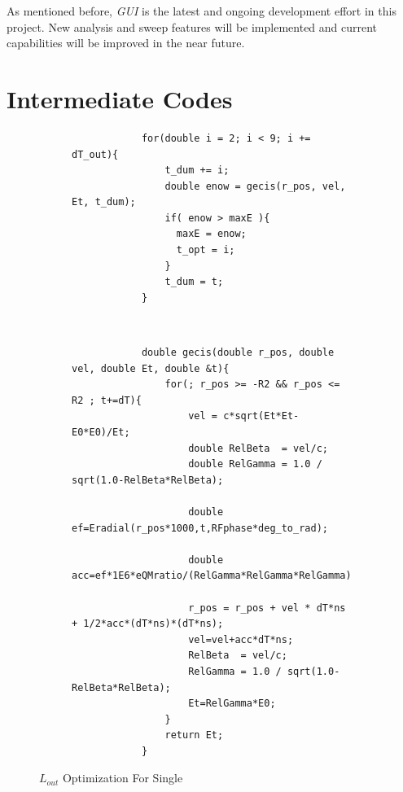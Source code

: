 \documentclass[a4paper,oneside,12pt]{report}
\numberwithin{equation}{chapter}
\begin{document}
As mentioned before, \textit{GUI} is the latest and ongoing development effort in this project.
New analysis and sweep features will be implemented and current capabilities will be improved in the near future.



\newpage


\appendix
\chapter{Intermediate Codes} \label{appendix:intermediate_codes}
\begin{figure}[H]
    \centering
    \captionsetup{justification=centering}
    \begin{subfigure}{\textwidth}
        \centering
        \begin{verbatim}
            for(double i = 2; i < 9; i += dT_out){
                t_dum += i;
                double enow = gecis(r_pos, vel, Et, t_dum);
                if( enow > maxE ){
                  maxE = enow;
                  t_opt = i;
                }
                t_dum = t;
            }
        \end{verbatim}
    \end{subfigure} 
    \\
    \begin{subfigure}{\textwidth}
        \centering
        \begin{verbatim}
            double gecis(double r_pos, double vel, double Et, double &t){
                for(; r_pos >= -R2 && r_pos <= R2 ; t+=dT){
                    vel = c*sqrt(Et*Et-E0*E0)/Et;
                    double RelBeta  = vel/c;
                    double RelGamma = 1.0 / sqrt(1.0-RelBeta*RelBeta);
                
                    double ef=Eradial(r_pos*1000,t,RFphase*deg_to_rad);
                
                    double acc=ef*1E6*eQMratio/(RelGamma*RelGamma*RelGamma); 
                
                    r_pos = r_pos + vel * dT*ns + 1/2*acc*(dT*ns)*(dT*ns);
                    vel=vel+acc*dT*ns;
                    RelBeta  = vel/c;
                    RelGamma = 1.0 / sqrt(1.0-RelBeta*RelBeta);
                    Et=RelGamma*E0; 
                }
                return Et;
            }
        \end{verbatim}
    \end{subfigure}
    \caption{$L_{out}$ Optimization For Single \e}
    \label{fig:lout_opt_single_e}
\end{figure}
\end{document}
